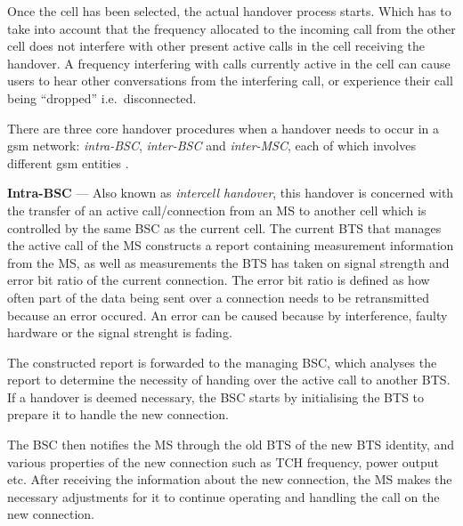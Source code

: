 Once the cell has been selected, the actual handover process starts. Which has to take into account that the frequency allocated to the incoming call from the other cell does not interfere with other present active calls in the cell receiving the handover\cite{Eisenblatter,GSMArchitectureProtocolsServices,wirelesstelcoMullet}. A frequency interfering with calls currently active in the cell can cause users to hear other conversations from the interfering call, or experience their call being ``dropped'' i.e.\ disconnected\cite{Eisenblatter}. 

There are three core handover procedures when a handover needs to occur in a \gls{gsm} network: \emph{intra-BSC}, \emph{inter-BSC} and \emph{inter-MSC}, each of which involves different \gls{gsm} entities \cite{wirelesstelcoMullet}.

\begin{description}
\item{\textbf{Intra-BSC}} --- Also known as \emph{intercell handover}, this handover is concerned with the transfer of an active call/connection from an \gls{MS} to another cell which is controlled by the same \gls{BSC} as the current cell\cite{wirelesstelcoMullet,GSMArchitectureProtocolsServices}. The current \gls{BTS} that manages the active call of the \gls{MS} constructs a report containing measurement information from the MS, as well as measurements the \gls{BTS} has taken on signal strength and error bit ratio of the current connection\cite{wirelesstelcoMullet,GSMArchitectureProtocolsServices}. The error bit ratio is defined as how often part of the data being sent over a connection needs to be retransmitted because an error occured\cite{wirelesstelcoMullet,GSMArchitectureProtocolsServices}. An error can be caused because by interference, faulty hardware or the signal strenght is fading\cite{wirelesstelcoMullet,GSMArchitectureProtocolsServices}. 

  The constructed report is forwarded to the managing \gls{BSC}, which analyses the report to determine the necessity of handing over the active call to another \gls{BTS}\@. If a handover is deemed necessary, the \gls{BSC} starts by initialising the \gls{BTS} to prepare it to handle the new connection\cite{wirelesstelcoMullet,GSMArchitectureProtocolsServices}.

The \gls{BSC} then notifies the \gls{MS} through the old \gls{BTS} of the new \gls{BTS} identity, and various properties of the new connection such as \gls{TCH} frequency, power output etc. After receiving the information about the new connection, the \gls{MS} makes the necessary adjustments for it to continue operating and handling the call on the new connection\cite{wirelesstelcoMullet,GSMArchitectureProtocolsServices}. 


\end{description}
